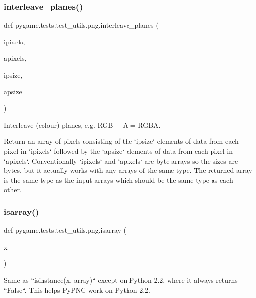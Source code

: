 \subsubsection{\texorpdfstring{interleave\+\_\+planes()}{interleave\_planes()}}
{\footnotesize\ttfamily def pygame.\+tests.\+test\+\_\+utils.\+png.\+interleave\+\_\+planes (\begin{DoxyParamCaption}\item[{}]{ipixels,  }\item[{}]{apixels,  }\item[{}]{ipsize,  }\item[{}]{apsize }\end{DoxyParamCaption})}

\begin{DoxyVerb}Interleave (colour) planes, e.g. RGB + A = RGBA.

Return an array of pixels consisting of the `ipsize` elements of data
from each pixel in `ipixels` followed by the `apsize` elements of data
from each pixel in `apixels`.  Conventionally `ipixels` and
`apixels` are byte arrays so the sizes are bytes, but it actually
works with any arrays of the same type.  The returned array is the
same type as the input arrays which should be the same type as each other.
\end{DoxyVerb}
 \mbox{\label{namespacepygame_1_1tests_1_1test__utils_1_1png_acd7de95dee0ef9c5568c707e8cb0582a}} 
\subsubsection{\texorpdfstring{isarray()}{isarray()}}
{\footnotesize\ttfamily def pygame.\+tests.\+test\+\_\+utils.\+png.\+isarray (\begin{DoxyParamCaption}\item[{}]{x }\end{DoxyParamCaption})}

\begin{DoxyVerb}Same as ``isinstance(x, array)`` except on Python 2.2, where it
always returns ``False``.  This helps PyPNG work on Python 2.2.
\end{DoxyVerb}
 \mbox{\label{namespacepygame_1_1tests_1_1test__utils_1_1png_ab33968646e6b616b529781ea7e930004}} 
